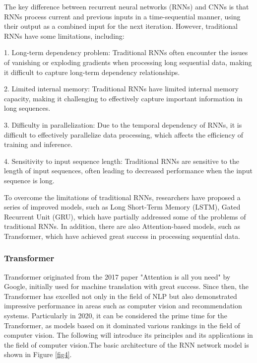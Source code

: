 \documentclass[10pt,twocolumn,letterpaper]{article}
\begin{document}
The key difference between recurrent neural networks (RNNs) and CNNs is that RNNs process current and previous inputs in a time-sequential manner, using their output as a combined input for the next iteration.
However, traditional RNNs have some limitations, including:

1. Long-term dependency problem: Traditional RNNs often encounter the issues of vanishing or exploding gradients when processing long sequential data, making it difficult to capture long-term dependency relationships.

2. Limited internal memory: Traditional RNNs have limited internal memory capacity, making it challenging to effectively capture important information in long sequences.

3. Difficulty in parallelization: Due to the temporal dependency of RNNs, it is difficult to effectively parallelize data processing, which affects the efficiency of training and inference.

4. Sensitivity to input sequence length: Traditional RNNs are sensitive to the length of input sequences, often leading to decreased performance when the input sequence is long.

To overcome the limitations of traditional RNNs, researchers have proposed a series of improved models, such as Long Short-Term Memory (LSTM), Gated Recurrent Unit (GRU), which have partially addressed some of the problems of traditional RNNs. In addition, there are also Attention-based models, such as Transformer, which have achieved great success in processing sequential data.

\subsubsection[short]{Transformer}

Transformer originated from the 2017 paper "Attention is all you need" by Google, initially used for machine translation with great success. Since then, the Transformer has excelled not only in the field of NLP but also demonstrated impressive performance in areas such as computer vision and recommendation systems. Particularly in 2020, it can be considered the prime time for the Transformer, as models based on it dominated various rankings in the field of computer vision. The following will introduce its principles and its applications in the field of computer vision.The basic architecture of the RNN network model is shown in Figure \ref{fig4}.
\end{document}
